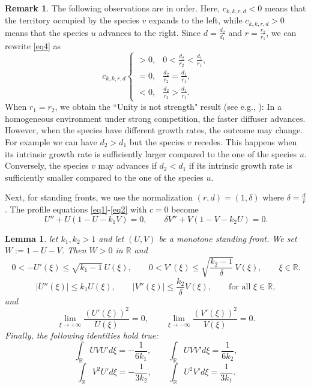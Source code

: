 \documentclass[11pt]{article}
\numberwithin{equation}{section}
\newcommand{\1}{\mathbbm{1}}
\numberwithin{equation}{section}
\newtheorem{lemma}[theorem]{Lemma}
\theoremstyle{definition}
\newtheorem{remark}[theorem]{Remark}
\def \R {\mathbb{R}}
\numberwithin{equation}{section}
\begin{document}
\begin{remark}\label{rem1} The following observations are in order.
Here, $c_{k,k,r,d}<0$ means that the territory occupied by the species $v$ expands to the left, while $c_{k,k,r,d}>0$ means that the species $u$ advances to the right. Since $d=\frac{d_2}{d_1}$ and  $r=\frac{r_2}{r_1}$, we can rewrite \eqref{eq4} as 
\begin{equation}
c_{k,k,r,d} \left\{ 
	\begin{array}{llllll}
		>0, &  0<\frac{d_2}{r_2}<\frac{d_1}{r_1},\\
		=0, &  \frac{d_2}{r_2}=\frac{d_1}{r_1},\\
		<0, & \frac{d_2}{r_2}>\frac{d_1}{r_1}.
	\end{array} 
	\right.
\end{equation}
When $r_1=r_2$, we obtain the ``Unity is not strength" result (see e.g., \cite{girardin2019,girardin2018}): In a homogeneous environment under strong competition, the faster diffuser advances.  However, when the species have different growth rates, the outcome may change. For example we can have $d_2>d_1$ but the species $v$ recedes. This happens when its intrinsic growth rate is sufficiently larger compared to the one of the species $u$. Conversely, the species $v$ may advances  if $d_2<d_1$ if its intrinsic growth rate is sufficiently smaller compared to the one of the species $u$. 
\end{remark}

Next, for standing fronts, we use the normalization $(r,d)=(1,\delta)$ where $\delta=\frac{d}{r}$. The profile equations \eqref{eq1}-\eqref{eq2} with $c=0$ become
\begin{equation}\label{standing0}
U''+U(1-U-k_1V)=0, \qquad \delta V''+V(1-V-k_2U)=0.
\end{equation}

\begin{lemma}\label{lemineq1}
let $k_1,k_2>1$ and  let $(U,V)$ be a monotone standing front. We set $W:=1-U-V$. Then $W>0$ in $\R$ and
	\begin{equation}\label{ari2}
		0<-U'(\xi)\leq\sqrt{k_1-1}\,U(\xi),\qquad
		0<V'(\xi)\leq\sqrt{\frac{k_2-1}{\delta}}\,V(\xi),\qquad \xi\in\R.
	\end{equation}
\begin{equation}\label{ari3}
	|U''(\xi)|\leq k_1U(\xi),\qquad
	|V''(\xi)|\leq\frac{k_2}{\delta}V(\xi),\qquad \text{for all } \xi\in\R,
\end{equation}
and
\begin{equation}\label{ari4}
	\lim_{\xi\to+\infty}\frac{(U'(\xi))^2}{U(\xi)}=0,
	\qquad
	\lim_{\xi\to-\infty}\frac{(V'(\xi))^2}{V(\xi)}=0.
\end{equation}
Finally, the following identities hold true:
	\begin{equation}\label{ari0}
	\int_{\R} UVU'd\xi=-\frac1{6k_1},\qquad 	\int_{\R} UVV'd\xi=\frac1{6k_2},
	\end{equation}
	\begin{equation}\label{ari1}
		\int_{\R} V^2U'd\xi=-\frac1{3k_2},\qquad \int_{\R} U^2V'd\xi=\frac1{3k_1}.
	\end{equation}
\end{lemma}
\end{document}
